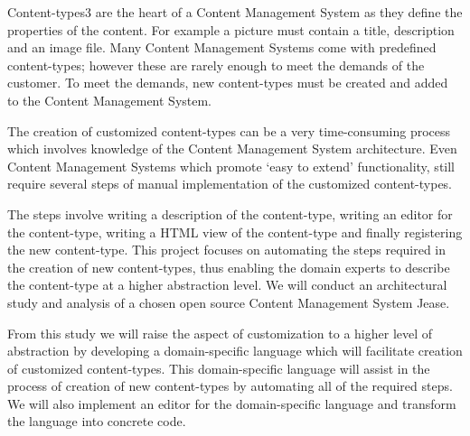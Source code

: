 Content-types3 are the heart of a Content Management System as they define the properties of the
content. For example a picture must contain a title, description and an image file. Many Content
Management Systems come with predefined content-types; however these are rarely enough to meet
the demands of the customer. To meet the demands, new content-types must be created and added to
the Content Management System.

The creation of customized content-types can be a very time-consuming process which involves
knowledge of the Content Management System architecture. Even Content Management Systems which
promote ‘easy to extend’ functionality, still require several steps of manual implementation of
the customized content-types.

The steps involve writing a description of the content-type, writing an editor for the content-type,
writing a HTML view of the content-type and finally registering the new content-type. This project
focuses on automating the steps required in the creation of new content-types, thus enabling the
domain experts to describe the content-type at a higher abstraction level. We will conduct an
architectural study and analysis of a chosen open source Content Management System Jease.

From this study we will raise the aspect of customization to a higher level of
abstraction by developing a domain-specific language which will facilitate creation of
customized content-types. This domain-specific language will assist in the process of creation of new
content-types by automating all of the required steps. We will also implement an editor for the
domain-specific language and transform the language into concrete code.


